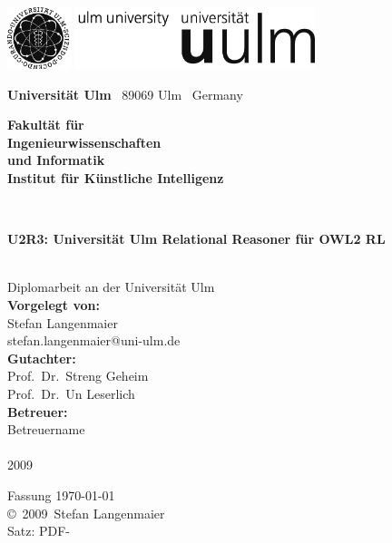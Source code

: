\documentclass[a4paper,10pt,bibtotoc,twoside,openright,pointlessnumbers,normalheadings,DIV=9
]{scrbook}
\makeatletter
\newcommand{\fullname}{Stefan Langenmaier}
\newcommand{\email}{stefan.langenmaier@uni-ulm.de}
\newcommand{\titel}{U2R3: Universität Ulm Relational Reasoner für OWL2 RL}
\newcommand{\jahr}{2009}
\newcommand{\gutachterA}{Prof.~Dr.~Streng Geheim}
\newcommand{\gutachterB}{Prof.~Dr.~Un Leserlich}
\newcommand{\betreuer}{Betreuername}
\newcommand{\fakultaet}{Ingenieurwissenschaften\\und Informatik}
\newcommand{\institut}{Institut für Künstliche Intelligenz}
\makeatother
\begin{document}
\frontmatter

\thispagestyle{empty}
\begin{addmargin*}[4mm]{-32mm}

\includegraphics[height=1.8cm]{images/unilogo_bild}
\hfill
\includegraphics[height=1.8cm]{images/unilogo_wort}\\[1em]

{\footnotesize
{\bfseries Universität Ulm} \textbar ~89069 Ulm \textbar ~Germany
\hspace*{78.5mm}\parbox[t]{38mm}{\bfseries Fakultät für\\
\fakultaet\\
\mdseries \institut}\\[2cm]

\parbox{140mm}{\bfseries \huge \titel}\\[0.5em]
{\footnotesize Diplomarbeit an der Universität Ulm}\\[3em]

{\footnotesize \bfseries Vorgelegt von:}\\
{\footnotesize \fullname\\\email}\\[2em]
{\footnotesize \bfseries Gutachter:}\\                     
{\footnotesize\gutachterA\\
\gutachterB}\\[2em]
{\footnotesize \bfseries Betreuer:}\\ 
{\footnotesize\betreuer}\\\\
{\footnotesize\jahr}
}
\end{addmargin*}


\clearpage
\thispagestyle{empty}
{ \small
  \flushleft
  Fassung \today \\\vfill
  \copyright~\jahr~\fullname\\[0.5em]

  Satz: PDF-\LaTeXe
}
\end{document}
